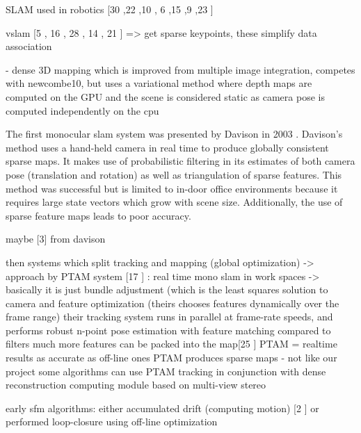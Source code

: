 
SLAM used in robotics [30 \cite{Thrun02Robotic},22 \cite{Nuchter056d},10 \cite{Grisetti07Efficient}, 6 \cite{Dellaert06Square},15 \cite{Kaess08Isam},9 \cite{Frese05Multilevel},23 \cite{Olson06Fast}]


vslam [5 \cite{Davison03Real} , 16 \cite{Klein07Parallel}, 28 \cite{Strasdat10Real}, 14 \cite{Jin00Real}, 21 \cite{Nister05Preemptive}] => get sparse keypoints,  
these simplify data association

\cite{Stuhmer10Real} - dense 3D mapping which is improved from multiple image integration, competes with newcombe10, but uses a variational method where depth maps are computed on the GPU and the scene is considered static as camera pose is computed independently on the cpu


The first monocular slam system was presented by Davison in 2003 \cite{Davison03Real}. Davison's method uses a hand-held camera in real time to produce globally consistent sparse maps. It makes use of probabilistic filtering in its estimates of both camera pose (translation and rotation) as well as triangulation of sparse features. This method was successful but is limited to in-door office environments because it requires large state vectors which grow with scene size. Additionally, the use of sparse feature maps leads to poor accuracy. 

maybe [3] from davison

then systems which split tracking and mapping (global optimization) -> approach by PTAM system [17 \cite{Klein07Parallel}]
: real time mono slam in work spaces -> basically it is just bundle adjustment (which is the least squares solution to camera and feature optimization (theirs chooses features dynamically over the frame range)
their tracking system runs in parallel at frame-rate speeds, and performs robust n-point pose estimation with feature matching
compared to filters much more features can be packed into the map[25 \cite{Strasdat10Real} ]
PTAM = realtime results as accurate as off-line ones
PTAM produces sparse maps - not like our project
some algorithms can use PTAM tracking in conjunction with dense reconstruction computing module based on multi-view stereo 


early sfm algorithms: either accumulated drift (computing motion) [2 \cite{Beardsley97Sequential} ] or performed loop-closure using off-line optimization 
